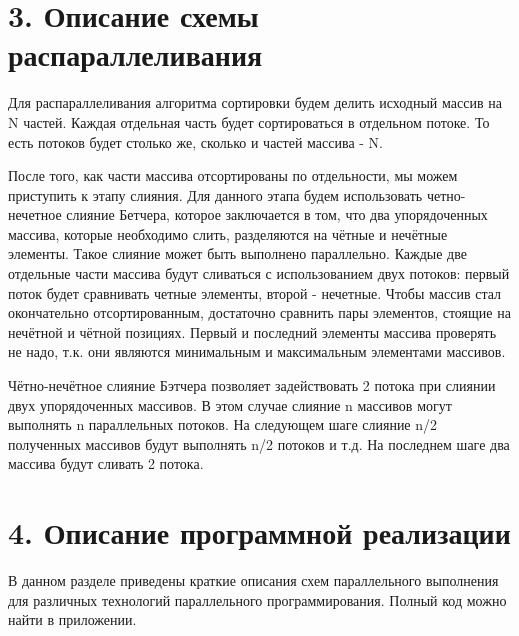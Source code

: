 \documentclass{report}
\begin{document}
\newpage
\section*{3. Описание схемы распараллеливания}
\par Для распараллеливания алгоритма сортировки будем делить исходный массив на N частей. Каждая отдельная часть будет сортироваться в отдельном потоке. То есть потоков будет столько же, сколько и частей массива - N.
\par После того, как части массива отсортированы по отдельности, мы можем приступить к этапу слияния. Для данного этапа будем использовать четно-нечетное слияние Бетчера, которое заключается в том, что два упорядоченных массива, которые необходимо слить, разделяются на чётные и нечётные элементы. Такое слияние может быть выполнено параллельно. Каждые две отдельные части массива будут сливаться с использованием двух потоков: первый поток будет сравнивать четные элементы, второй - нечетные. Чтобы массив стал окончательно отсортированным, достаточно сравнить пары элементов, стоящие на нечётной и чётной позициях. Первый и последний элементы массива проверять не надо, т.к. они являются минимальным и максимальным элементами массивов.
\par Чётно-нечётное слияние Бэтчера позволяет задействовать 2 потока
при слиянии двух упорядоченных массивов. В этом случае слияние n массивов могут выполнять n параллельных потоков. На следующем шаге слияние n/2 полученных массивов будут выполнять n/2 потоков и т.д. На последнем шаге два массива будут сливать 2 потока.

   


\newpage
\section*{4. Описание программной реализации}
\par В данном разделе приведены краткие описания схем параллельного выполнения для различных технологий параллельного программирования. Полный код можно найти в приложении.
\end{document}
